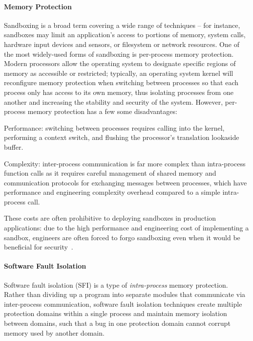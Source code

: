 \paragraph{Memory Protection}  Sandboxing is a broad term covering a wide range of techniques -- for
instance, sandboxes may limit an application's access to portions of memory, system calls, hardware
input devices and sensors, or filesystem or network resources. One of the most widely-used forms of
sandboxing is per-process memory protection. Modern processors allow the operating system to
designate specific regions of memory as accessible or restricted; typically, an operating system
kernel will reconfigure memory protection when switching between processes so that each process only
has access to its own memory, thus isolating processes from one another and increasing the stability
and security of the system. However, per-process memory protection has a few some disadvantages:

\squishlist
    \item Performance: switching between processes requires calling into the kernel, performing a context
        switch, and flushing the processor's translation lookaside buffer.
    \item Complexity: inter-process communication
        is far more complex than intra-process function calls as it requires careful management of shared memory and
        communication protocols for exchanging messages between processes, which have performance and engineering
        complexity overhead compared to a simple intra-process call.
\squishend

These costs are often prohibitive to deploying sandboxes in production applications: due to the high
performance and engineering cost of implementing a sandbox, engineers are often forced to forgo
sandboxing even when it would be beneficial for security~\cite {google:limits}.

\paragraph{Software Fault Isolation} Software fault isolation (SFI) is a type of
\textit{intra-process} memory protection. Rather than dividing up a program into separate modules
that communicate via inter-process communication, software fault isolation techniques create
multiple protection domains within a single process and maintain memory isolation between domains,
such that a bug in one protection domain cannot corrupt memory used by another domain.

